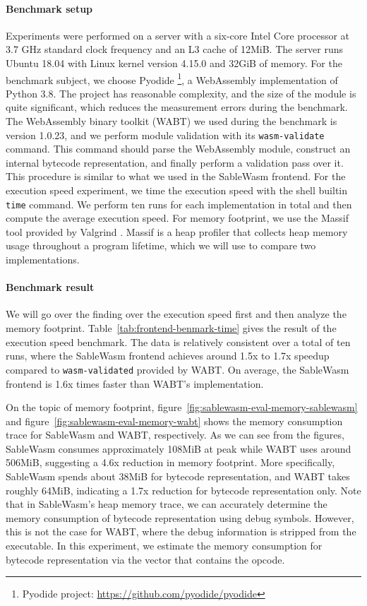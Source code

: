 \paragraph{Benchmark setup}
Experiments were performed on a server with a six-core Intel Core processor at
3.7 GHz standard clock frequency and an L3 cache of 12MiB. The server runs
Ubuntu 18.04 with Linux kernel version 4.15.0 and 32GiB of memory. For the
benchmark subject, we choose Pyodide \footnote{Pyodide project:
  \url{https://github.com/pyodide/pyodide}}, a WebAssembly implementation of
Python 3.8. The project has reasonable complexity, and the size of the module is
quite significant, which reduces the measurement errors during the benchmark.
The WebAssembly binary toolkit (WABT) we used during the benchmark is version
1.0.23, and we perform module validation with its \texttt{wasm-validate}
command. This command should parse the WebAssembly module, construct an internal
bytecode representation, and finally perform a validation pass over it. This
procedure is similar to what we used in the SableWasm frontend. For the
execution speed experiment, we time the execution speed with the shell builtin
\texttt{time} command. We perform ten runs for each implementation in total and
then compute the average execution speed. For memory footprint, we use the
Massif tool provided by Valgrind \cite{valgrind-paper}. Massif is a heap
profiler that collects heap memory usage throughout a program lifetime, which we
will use to compare two implementations.

\paragraph{Benchmark result}
We will go over the finding over the execution speed first and then analyze the
memory footprint. Table~\ref{tab:frontend-benmark-time} gives the result of the
execution speed benchmark. The data is relatively consistent over a total of ten
runs, where the SableWasm frontend achieves around 1.5x to 1.7x speedup compared
to \texttt{wasm-validated} provided by WABT. On average, the SableWasm frontend
is 1.6x times faster than WABT's implementation.



On the topic of memory footprint,
figure~\ref{fig:sablewasm-eval-memory-sablewasm} and
figure~\ref{fig:sablewasm-eval-memory-wabt} shows the memory consumption trace
for SableWasm and WABT, respectively. As we can see from the figures, SableWasm
consumes approximately 108MiB at peak while WABT uses around 506MiB, suggesting
a 4.6x reduction in memory footprint. More specifically, SableWasm spends about
38MiB for bytecode representation, and WABT takes roughly 64MiB, indicating a
1.7x reduction for bytecode representation only. Note that in SableWasm's heap
memory trace, we can accurately determine the memory consumption of bytecode
representation using debug symbols. However, this is not the case for WABT,
where the debug information is stripped from the executable. In this experiment,
we estimate the memory consumption for bytecode representation via the vector
that contains the opcode.

